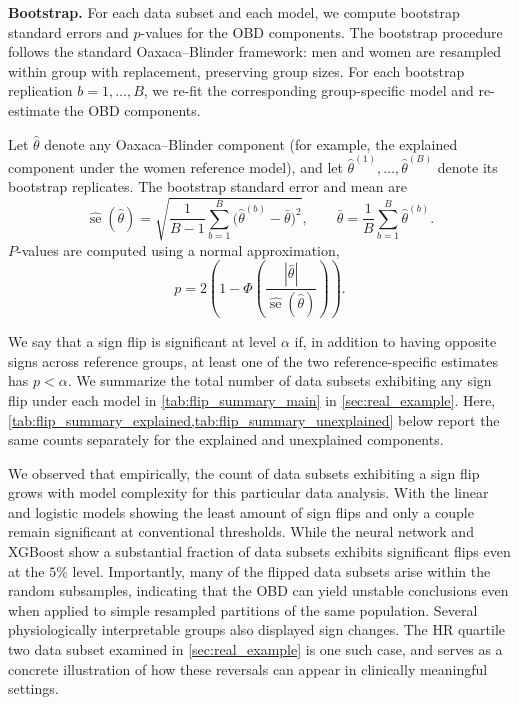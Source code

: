 \textbf{Bootstrap.}
For each data subset and each model, we compute bootstrap standard errors and $p$-values for the OBD components. The bootstrap procedure follows the standard Oaxaca--Blinder framework: men and women are resampled within group with replacement, preserving group sizes. For each bootstrap replication $b=1,\dots,B$, we re-fit the corresponding group-specific model and re-estimate the OBD components.

Let $\hat\theta$ denote any Oaxaca--Blinder component (for example, the explained component under the women reference model), and let $\hat\theta^{(1)},\dots,\hat\theta^{(B)}$ denote its bootstrap replicates. The bootstrap standard error and mean are
\[
    \widehat{\operatorname{se}}(\hat\theta)
    =
    \sqrt{
    \frac{1}{B-1}\sum_{b=1}^B
    \bigl(\hat\theta^{(b)} - \bar\theta\bigr)^2
    },
    \qquad
    \bar\theta = \frac{1}{B}\sum_{b=1}^B \hat\theta^{(b)}.
\]
$P$-values are computed using a normal approximation,
\[
    p = 2\left(1 - \Phi\left(\frac{|\hat\theta|}{\widehat{\operatorname{se}}(\hat\theta)}\right)\right).
\]

We say that a sign flip is significant at level $\alpha$ if, in addition to having opposite signs across reference groups, at least one of the two reference-specific estimates has $p < \alpha$. We summarize the total number of data subsets exhibiting any sign flip under each model in \cref{tab:flip_summary_main} in \cref{sec:real_example}. Here, \cref{tab:flip_summary_explained,tab:flip_summary_unexplained} below report the same counts separately for the explained and unexplained components.

We observed that empirically, the count of data subsets exhibiting a sign flip grows with model complexity for this particular data analysis. With the linear and logistic models showing the least amount of sign flips and only a couple remain significant at conventional thresholds. While the neural network and XGBoost show a substantial fraction of data subsets exhibits significant flips even at the $5\%$ level. Importantly, many of the flipped data subsets arise within the random subsamples, indicating that the OBD can yield unstable conclusions even when applied to simple resampled partitions of the same population. Several physiologically interpretable groups also displayed sign changes. The HR quartile two data subset examined in \cref{sec:real_example} is one such case, and serves as a concrete illustration of how these reversals can appear in clinically meaningful settings.

